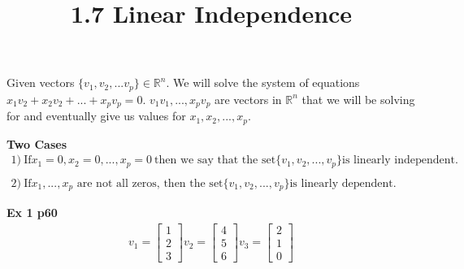 \documentclass{article}
\title{1.7 Linear Independence}
\begin{document}
  \maketitle
  Given vectors $ \{v_{1},v_{2},...v_{p}\} \in \mathbb{R}^{n} $. We will solve the system of equations $ x_{1}v_{2}+x_{2}v_{2}+...+x_{p}v_{p}=0$. $ v_{1}v_{1}, ..., x_{p}v_{p}$ are vectors in $\mathbb{R}^{n}$ that we will be solving for and eventually give us values for $ x_{1},x_{2},...,x_{p}$.

  \textbf{Two Cases}
  \[
    \begin{gathered}
      1)~\text{If} x_{1}=0, x_{2}=0,...,x_{p}=0~\text{then we say that the set} \{v_{1},v_{2},...,v_{p}\} \text{is linearly independent.} \\
      ~\\
      2)~\text{If} x_{1},...,x_{p} \text{ are not all zeros, then the set} \{v_{1},v_{2},...,v_{p}\} \text{is linearly dependent.} 
    \end{gathered}
  \]

  \textbf{Ex 1 p60}
  \[
    \begin{gathered}
    v_{1}= \begin{bmatrix}
      1\\
      2\\
      3
    \end{bmatrix}
    v_{2} = \begin{bmatrix}
      4\\
      5\\
      6
    \end{bmatrix}
    v_{3}=\begin{bmatrix}
      2\\
      1\\
      0
    \end{bmatrix} \\
    \end{gathered}
  \]
  
\end{document}

